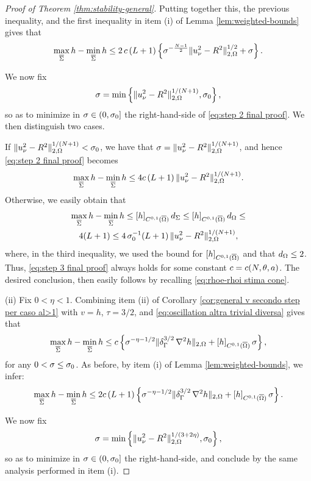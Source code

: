 \documentclass[a4paper,10pt]{amsart}
\numberwithin{equation}{section}
\begin{document}
\begin{proof}[Proof of Theorem \ref{thm:stability-general}]
Putting together this, the previous inequality, and the first inequality in item (i) of Lemma \ref{lem:weighted-bounds} gives that
\begin{equation}
\label{eq:step 2 final proof}
\max_{ \overline{\Sigma} } h - \min_{ \overline{\Sigma} } h \le  2 \, c \, (L+1)  \left\{ \sigma^{ -\frac{N-1}{2} }\Vert u_\nu^2 - R^2  \Vert_{2, \Omega }^{1/2} +  \sigma \right\}.
\end{equation}

We now fix 
$$
\sigma = \min \left\{\Vert u_\nu^2 - R^2  \Vert_{2, \Omega }^{1/(N+1)} , \sigma_0 \right\},
$$
so as to minimize in $\sigma  \in (0, \sigma_0]$ the right-hand-side of \eqref{eq:step 2 final proof}.
We then distinguish two cases.
\par
If $\Vert u_\nu^2 - R^2  \Vert_{2, \Omega }^{1/(N+1)} < \sigma_0$, we have that $\sigma = \Vert u_\nu^2 - R^2  \Vert_{2, \Omega }^{1/(N+1)}$, and hence \eqref{eq:step 2 final proof} becomes
\begin{equation}\label{eq:step 3 final proof}
\max_{ \overline{\Sigma} } h - \min_{ \overline{\Sigma} } h \le 4 c  \, (L+1) \, \Vert u_\nu^2 - R^2  \Vert_{2, \Omega }^{1/(N+1)} .
\end{equation}
%
%
Otherwise, we easily obtain that
\begin{multline*} 
\max_{ \overline{\Sigma} } h - \min_{ \overline{\Sigma} } h  \le [h]_{C^{0,1}(\overline{\Omega})}  \, d_{\Sigma} \le [h]_{C^{0,1}(\overline{\Omega})}  \, d_{\Omega} \le \\
4 (L+1)
\le 4 \, \sigma_0^{-1} (L+1 ) \,  \Vert u_\nu^2 - R^2  \Vert_{2, \Omega }^{1/(N+1)} , 
\end{multline*}
where, in the third inequality, we used the bound for $[h]_{C^{0,1}(\overline{\Omega})}$ and that $d_\Omega \le 2$.
Thus, \eqref{eq:step 3 final proof} always holds for some constant $c=c(N,\theta,a)$.
The desired conclusion, then easily follows by recalling \eqref{eq:rhoe-rhoi stima cone}.

(ii) Fix $0<\eta<1$.
Combining item (ii) of Corollary \ref{cor:general v secondo step per caso al>1} with $v=h$, $\tau=3/2$, and \eqref{eq:oscillation altra trivial diversa} gives that
\begin{equation*}
\max_{ \overline{\Sigma} } h - \min_{ \overline{\Sigma} } h \le c  \left\{ \sigma^{-\eta-1/2 } \Vert \delta_{\Gamma}^{3/2} \, \nabla^2 h  \Vert_{2, \Omega }  + [h]_{C^{0,1}(\overline{\Omega})} \, \sigma  \right\},
\end{equation*}
for any $0<\sigma \le \sigma_0$. 
As before, by item (i) of Lemma \ref{lem:weighted-bounds}, we infer:  
$$
\max_{ \overline{\Sigma} } h - \min_{ \overline{ \Sigma} } h \le 2c\,(L+1)  \left\{ \sigma^{-\eta-1/2 } \Vert \delta_{\Gamma}^{3/2} \, \nabla^2 h  \Vert_{2, \Omega }  + [h]_{C^{0,1}(\overline{\Omega})} \, \sigma  \right\}.
$$
\par
We now fix 
$$
\sigma = \min \left\{ \Vert u_\nu^2 - R^2  \Vert_{2, \Omega }^{1/(3 + 2 \eta)} , \sigma_0  \right\},
$$
so as to minimize in $\sigma \in (0, \sigma_0]$ the right-hand-side, and conclude by the same analysis performed in item (i).
\end{proof}
\end{document}
